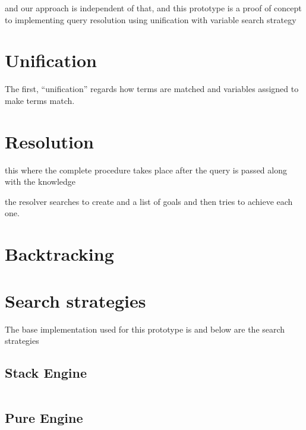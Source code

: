\documentclass[thesis-solanki.tex]{files}
\begin{document}
and our approach is independent of that, and this prototype is a proof of concept to implementing query resolution using unification with
variable search strategy


\section{Unification}
The first, ``unification'' regards how terms are matched and variables assigned to make terms
match.
\cite{website:prologunification}



\section{Resolution}
this where the complete procedure takes place after the query is passed along with the knowledge 

the resolver searches to create and a list of  goals and then tries to achieve each one.

\cite{website:prologresolution}

\cite{website:resolutionlogicwiki}


\section{Backtracking}

\section{Search strategies}
The base implementation used for this prototype  is \cite{website:mini-prolog-hugs98} and below are the search
strategies
\subsection{Stack Engine}
\begin{singlespace}
\inputminted[linenos, firstline=29, lastline=62]{haskell}{haskell-proto3-sudsy-woe.hs}
\end{singlespace}

\subsection{Pure Engine}
\begin{singlespace}
\inputminted[linenos, firstline=26, lastline=46]{haskell}{haskell-proto3-absurd-silicon.hs}
\end{singlespace}
\end{document}
